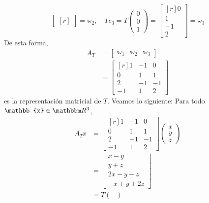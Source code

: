 \begin{example}
$$\begin{bmatrix*}[r]
    \end{bmatrix*} = \mathbb{w}_2, \quad Te_3 = T\begin{pmatrix}
        0 \\
        0 \\
        1
    \end{pmatrix} = \begin{bmatrix*}[r]
        0 \\
        1 \\
        -1 \\
        2
    \end{bmatrix*} = \mathbb{w}_3$$
    De esta forma,
    \begin{align*}
        A_T & = \begin{bmatrix}
            \mathbb{w}_1 & \mathbb{w}_2 & \mathbb{w}_3
        \end{bmatrix} \\
        & = \begin{bmatrix*}[r]
            1 & -1 & 0 \\
            0 & 1 & 1 \\
            2 & -1 & -1 \\
            -1 & 1 & 2
        \end{bmatrix*}
    \end{align*}
    es la representación matricial de $T$. Veamos lo siguiente: Para todo $\mathbb{x} \in \RR[3]$,
    \begin{align*}
        A_T\mathbb{x} & = \begin{bmatrix*}[r]
            1 & -1 & 0 \\
            0 & 1 & 1 \\
            2 & -1 & -1 \\
            -1 & 1 & 2
        \end{bmatrix*} \begin{pmatrix}
            x \\
            y \\
            z
        \end{pmatrix} \\
        & = \begin{bmatrix}
            x - y \\
            y + z \\
            2x - y - z \\
            - x + y + 2z
        \end{bmatrix} \\
        & = T \begin{pmatrix}

\end{pmatrix}
\end{align*}
\end{example}
